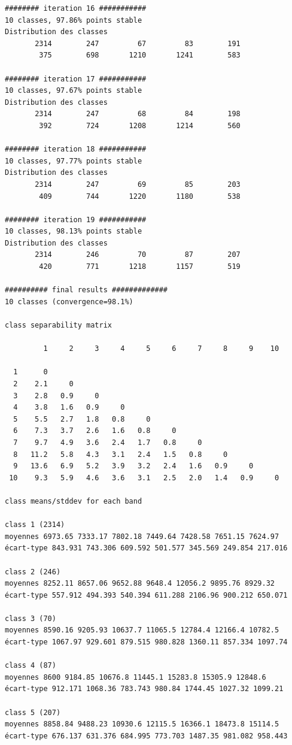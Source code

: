 \documentclass[earth,article,submit,pdftex,moreauthors]{Definitions/mdpi}
\begin{document}
\begin{scriptsize}
\begin{verbatim}
######## iteration 16 ###########
10 classes, 97.86% points stable
Distribution des classes
       2314        247         67         83        191
        375        698       1210       1241        583

######## iteration 17 ###########
10 classes, 97.67% points stable
Distribution des classes
       2314        247         68         84        198
        392        724       1208       1214        560

######## iteration 18 ###########
10 classes, 97.77% points stable
Distribution des classes
       2314        247         69         85        203
        409        744       1220       1180        538

######## iteration 19 ###########
10 classes, 98.13% points stable
Distribution des classes
       2314        246         70         87        207
        420        771       1218       1157        519

########## final results #############
10 classes (convergence=98.1%)

class separability matrix

         1     2     3     4     5     6     7     8     9    10

  1      0
  2    2.1     0
  3    2.8   0.9     0
  4    3.8   1.6   0.9     0
  5    5.5   2.7   1.8   0.8     0
  6    7.3   3.7   2.6   1.6   0.8     0
  7    9.7   4.9   3.6   2.4   1.7   0.8     0
  8   11.2   5.8   4.3   3.1   2.4   1.5   0.8     0
  9   13.6   6.9   5.2   3.9   3.2   2.4   1.6   0.9     0
 10    9.3   5.9   4.6   3.6   3.1   2.5   2.0   1.4   0.9     0

class means/stddev for each band

class 1 (2314)
moyennes 6973.65 7333.17 7802.18 7449.64 7428.58 7651.15 7624.97
écart-type 843.931 743.306 609.592 501.577 345.569 249.854 217.016

class 2 (246)
moyennes 8252.11 8657.06 9652.88 9648.4 12056.2 9895.76 8929.32
écart-type 557.912 494.393 540.394 611.288 2106.96 900.212 650.071

class 3 (70)
moyennes 8590.16 9205.93 10637.7 11065.5 12784.4 12166.4 10782.5
écart-type 1067.97 929.601 879.515 980.828 1360.11 857.334 1097.74

class 4 (87)
moyennes 8600 9184.85 10676.8 11445.1 15283.8 15305.9 12848.6
écart-type 912.171 1068.36 783.743 980.84 1744.45 1027.32 1099.21

class 5 (207)
moyennes 8858.84 9488.23 10930.6 12115.5 16366.1 18473.8 15114.5
écart-type 676.137 631.376 684.995 773.703 1487.35 981.082 958.443


\end{verbatim}
\end{scriptsize}
\end{document}
